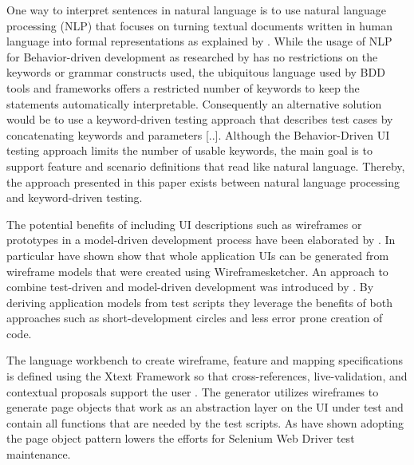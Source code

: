 \documentclass{sig-alternate-05-2015}
\begin{document}
One way to interpret sentences in natural language is to use natural language processing (NLP) that focuses on turning textual documents written in human language into formal representations as explained by \cite{collobert2008unified}.
While the usage of NLP for Behavior-driven development as researched by \cite{soeken2012assisted} has no restrictions on the keywords or grammar constructs used, the ubiquitous language used by BDD tools and frameworks offers a restricted number of keywords to keep the statements automatically interpretable.
Consequently an alternative solution would be to use a keyword-driven testing approach that describes test cases by concatenating keywords and parameters [..].
Although the Behavior-Driven UI testing approach limits the number of usable keywords, the main goal is to support feature and scenario definitions that read like natural language.
Thereby, the approach presented in this paper exists between natural language processing and keyword-driven testing.

The potential benefits of including UI descriptions such as wireframes or prototypes in a model-driven development process have been elaborated by \cite {Rivero2010}.
In particular \cite{sanchezgui} have shown show that whole application UIs can be generated from wireframe models that were created using Wireframesketcher.
An approach to combine test-driven and model-driven development was introduced by \cite{luna2009bridging}.
By deriving application models from test scripts they leverage the benefits of both approaches such as short-development circles and less error prone creation of code.

The language workbench to create wireframe, feature and mapping specifications is defined using the Xtext Framework so that cross-references, live-validation, and contextual proposals support the user \cite{Be13}.
The generator utilizes wireframes to generate page objects that work as an abstraction layer on the UI under test and contain all functions that are needed by the test scripts.
As \cite{leotta2013improving} have shown adopting the page object pattern lowers the efforts for Selenium Web Driver test maintenance.


\end{document}
